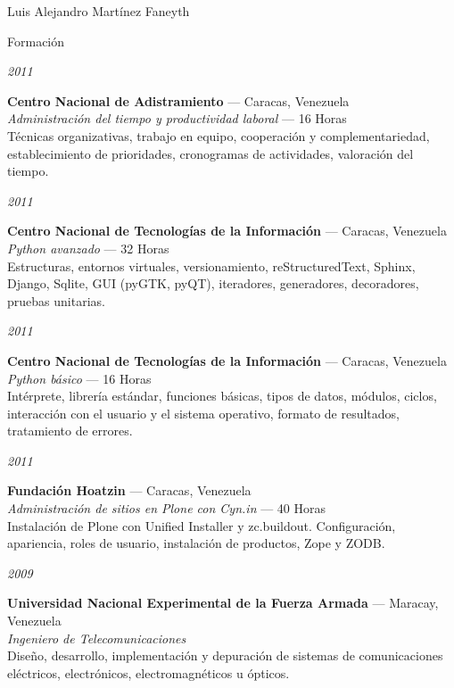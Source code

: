 \documentclass[11pt,letterpaper]{article}
\begin{document}
\begin{cv}{Luis Alejandro Mart\'inez Faneyth}
\begin{cvlist}{Formaci\'on}
\item[{\parbox[t]{6em}{\textit{\large{2011}}}}]{
	\parbox[t]{\linewidth}{
		\textbf{Centro Nacional de Adistramiento} --- Caracas, Venezuela\\
		\textit{Administraci\'on del tiempo y productividad laboral} --- 16 Horas\\
		\footnotesize{T\'ecnicas organizativas, trabajo en equipo, cooperaci\'on y complementariedad, establecimiento de prioridades, cronogramas de actividades, valoraci\'on del tiempo.}
	}
}
\item[{\parbox[t]{6em}{\textit{\large{2011}}}}]{
	\parbox[t]{\linewidth}{
		\textbf{Centro Nacional de Tecnolog\'ias de la Informaci\'on} --- Caracas, Venezuela\\
		\textit{Python avanzado} --- 32 Horas\\
		\footnotesize{Estructuras, entornos virtuales, versionamiento, reStructuredText, Sphinx, Django, Sqlite, GUI (pyGTK, pyQT), iteradores, generadores, decoradores, pruebas unitarias.}
	}
}
\item[{\parbox[t]{6em}{\textit{\large{2011}}}}]{
	\parbox[t]{\linewidth}{
		\textbf{Centro Nacional de Tecnolog\'ias de la Informaci\'on} --- Caracas, Venezuela\\
		\textit{Python b\'asico} --- 16 Horas\\
		\footnotesize{Int\'erprete, librer\'ia est\'andar, funciones b\'asicas, tipos de datos, m\'odulos, ciclos, interacci\'on con el usuario y el sistema operativo, formato de resultados, tratamiento de errores.}
	}
}
\item[{\parbox[t]{6em}{\textit{\large{2011}}}}]{
	\parbox[t]{\linewidth}{
		\textbf{Fundaci\'on Hoatzin} --- Caracas, Venezuela\\
		\textit{Administraci\'on de sitios en Plone con Cyn.in} --- 40 Horas\\
		\footnotesize{Instalaci\'on de Plone con Unified Installer y zc.buildout. Configuraci\'on, apariencia, roles de usuario, instalaci\'on de productos, Zope y ZODB.}
	}
}
\item[{\parbox[t]{6em}{\textit{\large{2009}}}}]{
	\parbox[t]{\linewidth}{
		\textbf{Universidad Nacional Experimental de la Fuerza Armada} --- Maracay, Venezuela\\
		\textit{Ingeniero de Telecomunicaciones}\\
		\footnotesize{Dise\~no, desarrollo, implementaci\'on y depuraci\'on de sistemas de comunicaciones el\'ectricos, electr\'onicos, electromagn\'eticos u \'opticos.}
	}
}
\end{cvlist}


\end{cv}
\end{document}
